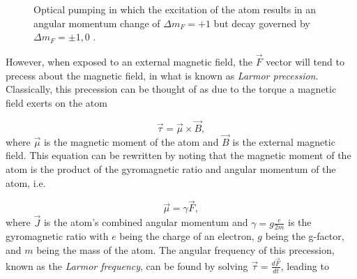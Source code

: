 

\begin{figure}[ht]
	\centering
	
	\caption{Optical pumping in which the excitation of the atom results in an angular momentum change of $\Delta m_F = +1$ but decay governed by $\Delta m_F = \pm 1, 0$ \protect\cite{opticalpumping}.}
	\label{fig:opticalpumping}
\end{figure}



However, when exposed to an external magnetic field, the $\vec F$ vector will tend to precess about the magnetic field, in what is known as \textit{Larmor precession}. Classically, this precession can be thought of as due to the torque a magnetic field exerts on the atom

\begin{equation}
  \vec \tau = \vec \mu \times \vec B,
  \label{larmortorque}
\end{equation}
%
where $\vec \mu$ is the magnetic moment of the atom and $\vec B$ is the external magnetic field. This equation can be rewritten by noting that the magnetic moment of the atom is the product of the gyromagnetic ratio and angular momentum of the atom, i.e.

\begin{equation}
  \vec \mu = \gamma \vec F,
  \label{magneticmoment}
\end{equation}
%
where $\vec J$ is the atom's combined angular momentum and $\gamma = g\frac{e}{2m}$ is the gyromagnetic ratio with $e$ being the charge of an electron, $g$ being the g-factor, and $m$ being the mass of the atom.
%
%
The angular frequency of this precession, known as the \textit{Larmor frequency}, can be found by solving $\vec \tau = \frac{d\vec F}{dt}$, leading to

